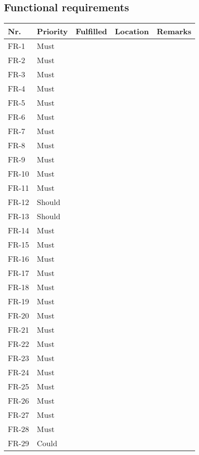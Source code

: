 \subsection{Functional requirements}
\begin{table}[H]
	\begin{tabular}{lllll}
						    
		Nr.   & Priority & Fulfilled & Location & Remarks \\ \hline
		FR-1  & Must     & ~        & ~         & ~       \\ 
		FR-2  & Must     & ~        & ~         & ~       \\ 
		FR-3  & Must     & ~        & ~         & ~       \\ 
		FR-4  & Must     & ~        & ~         & ~       \\ 
		FR-5  & Must     & ~        & ~         & ~       \\ 
		FR-6  & Must     & ~        & ~         & ~       \\ 
		FR-7  & Must     & ~        & ~         & ~       \\ 
		FR-8  & Must     & ~        & ~         & ~       \\ 
		FR-9  & Must     & ~        & ~         & ~       \\ 
		FR-10 & Must     & ~        & ~         & ~       \\ 
		FR-11 & Must     & ~        & ~         & ~       \\ 
		FR-12 & Should   & ~        & ~         & ~       \\ 
		FR-13 & Should   & ~        & ~         & ~       \\ 
		FR-14 & Must     & ~        & ~         & ~       \\ 
		FR-15 & Must     & ~        & ~         & ~       \\ 
		FR-16 & Must     & ~        & ~         & ~       \\ 
		FR-17 & Must     & ~        & ~         & ~       \\ 
		FR-18 & Must     & ~        & ~         & ~       \\ 
		FR-19 & Must     & ~        & ~         & ~       \\ 
		FR-20 & Must     & ~        & ~         & ~       \\ 
		FR-21 & Must     & ~        & ~         & ~       \\ 
		FR-22 & Must     & ~        & ~         & ~       \\ 
		FR-23 & Must     & ~        & ~         & ~       \\ 
		FR-24 & Must     & ~        & ~         & ~       \\ 
		FR-25 & Must     & ~        & ~         & ~       \\ 
		FR-26 & Must     & ~        & ~         & ~       \\ 
		FR-27 & Must     & ~        & ~         & ~       \\ 
		FR-28 & Must     & ~        & ~         & ~       \\ 
		FR-29 & Could    & ~        & ~         & ~       \\
						

\end{tabular}
\end{table}
